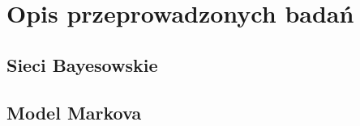 \newpage

\section{Opis przeprowadzonych badań}

\subsection{Sieci Bayesowskie}

\newpage

\subsection{Model Markova}
